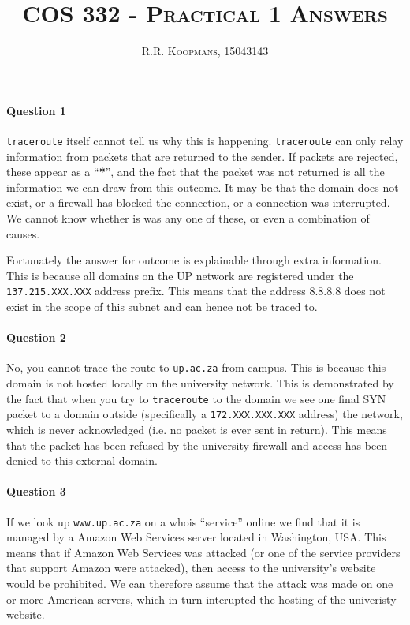 \documentclass[12pt,a4paper]{article}
\title{\textsc{COS 332 - Practical 1 Answers}}
\author{\textsc{R.R. Koopmans, 15043143}}
\begin{document}
\maketitle

\paragraph{Question 1}

\texttt{traceroute} itself cannot tell us why this is happening.
\texttt{traceroute} can only relay information from packets that are returned to
the sender. If packets are rejected, these appear as a ``\textbf{*}'', and the fact
that the packet was not returned is all the information we can draw from this
outcome. It may be that the domain does not exist, or a firewall has blocked the
connection, or a connection was interrupted. We cannot know whether is was any
one of these, or even a combination of causes.

Fortunately the answer for outcome is explainable through extra information.
This is because all domains on the UP network are registered under the
\texttt{137.215.XXX.XXX} address prefix. This means that the address 8.8.8.8
does not exist in the scope of this subnet and can hence not be traced to.

\paragraph{Question 2}

No, you cannot trace the route to \texttt{up.ac.za} from campus. This is because
this domain is not hosted locally on the university network. This is
demonstrated by the fact that when you try to \texttt{traceroute} to the domain
we see one final SYN packet to a domain outside (specifically a 
\texttt{172.XXX.XXX.XXX} address) the network, which  is never acknowledged 
(i.e. no packet is ever sent in return). This means that the packet has been refused by 
the university firewall and access has been denied to this external domain.

\paragraph{Question 3}

If we look up \texttt{www.up.ac.za} on a whois ``service'' online we find that it 
is managed by a Amazon Web Services server located in Washington, USA. This means that if
Amazon Web Services was attacked (or one of the service providers that support
Amazon were attacked), then access to the university's website would be
prohibited. We can therefore assume that the attack was made on one or more 
American servers, which in turn interupted the hosting of the univeristy 
website.
\end{document}
